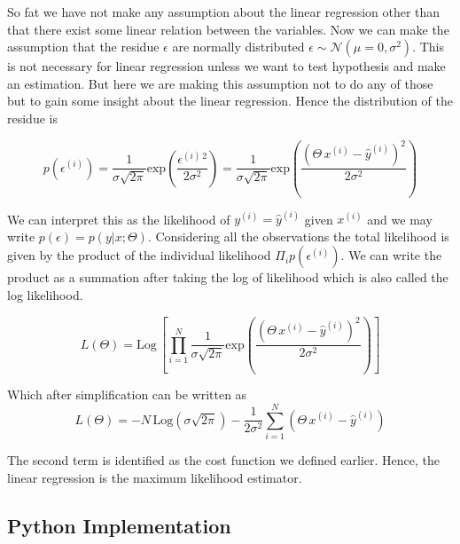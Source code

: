 \documentclass[11pt]{article}
\theoremstyle{definition}
\begin{document}
So fat we have not make any assumption about the linear regression other than that there exist some linear relation between the variables. Now we can make the assumption that the residue $\epsilon$ are normally distributed $\epsilon \sim \mathcal{N}(\mu=0, \sigma^2)$. This is not necessary for linear regression unless we want to test hypothesis and make an estimation. But here we are making this assumption not to do any of those but to gain some insight about the linear regression. Hence the distribution of the residue is 


$$
p(\epsilon^{(i)}) = \frac{1}{\sigma\sqrt{2\pi}} \text{exp}\left(\frac{\epsilon^{(i)\, 2}}{2\sigma^2}\right) = \frac{1}{\sigma\sqrt{2\pi}} \text{exp}\left(\frac{(\Theta \, x^{(i)} - \hat{y}^{(i)})^2}{2\sigma^2}\right)
$$




We can interpret this as the likelihood of $y^{(i)}=\hat{y}^{(i)}$ given $x^{(i)}$ and we may write $p(\epsilon) = p(y | x; \Theta)$. Considering all the observations the total likelihood is given by the product of the individual likelihood $\Pi_i p(\epsilon^{(i)})$. We can write the product as a summation after taking the log of likelihood which is also called the log likelihood. 


$$
L(\Theta) = \text{Log}\, \left[ \prod_{i=1}^{N} \frac{1}{\sigma\sqrt{2\pi}} \text{exp}\left(\frac{(\Theta \, x^{(i)} - \hat{y}^{(i)})^2}{2\sigma^2}\right) \right]
$$


Which after simplification can be written as 
$$
L(\Theta) = - N \, \text{Log} (\sigma \sqrt{2\pi}) - \frac{1}{2\sigma^2}\sum_{i=1}^N (\Theta \, x^{(i)} - \hat{y}^{(i)})
$$


The second term is identified as the cost function we defined earlier. Hence, the linear regression is the maximum likelihood estimator. 



\subsection{Python Implementation}
\end{document}
